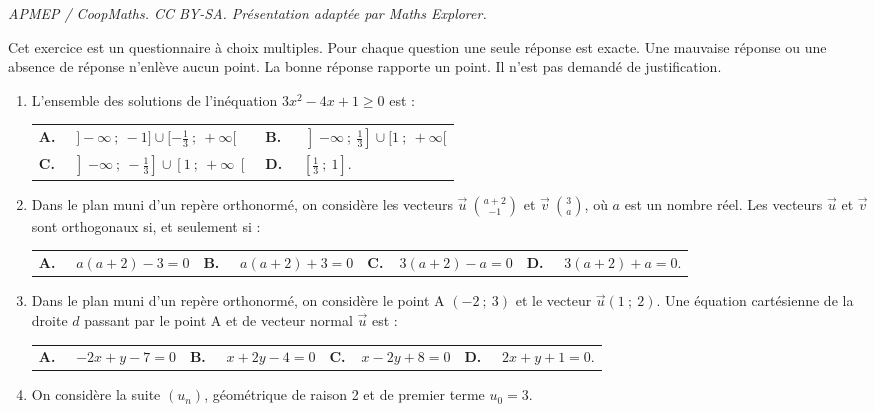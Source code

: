 \documentclass[10pt]{article}
\providecommand{\vv}[1]{\overrightarrow{#1}}
\providecommand{\vv}[1]{{\overrightarrow{#1}}}
\begin{document}
\noindent\textit{APMEP / CoopMaths. CC BY-SA. Présentation adaptée par Maths Explorer.}\par\medskip
\medskip

Cet exercice est un questionnaire à choix multiples. Pour chaque question une seule réponse est exacte. Une mauvaise réponse ou une absence de réponse n'enlève aucun point. La bonne réponse rapporte un point. Il n'est pas demandé de justification.

\begin{enumerate}
\item  L'ensemble des solutions de l'inéquation $3x^2-4x+1\geqslant 0$ est :

\medskip

\begin{tabularx}{\linewidth}{*{2}{X}}
\textbf{A.~~} $]-\infty~;~-1]\cup[-\frac{1}{3}~;~+\infty[ $ &\textbf{B.~~} $ 
\left]-\infty~;~\frac{1}{3}\right]\cup [1~;~+\infty[$\\\textbf{C.~~}$\left]-\infty~;~-\frac{1}{3}\right]\cup\left[1~;~+\infty\right[ $& \textbf{D.~~} $ \left[\frac{1}{3}~;~1\right] $.
\end{tabularx}

\item Dans le plan muni d'un repère orthonormé, on considère les vecteurs $\vv{u} \ \binom{a+2}{-1}$ et $\vv{v}\ \binom{3}{a}$, où $a$ est un nombre réel. Les vecteurs $\vv{u}$ et $\vv{v}$ sont orthogonaux si, et seulement si :

\medskip

\begin{tabularx}{\linewidth}{*{4}{X}}
\textbf{A.~~} $ a(a+2)-3=0$ &\textbf{B.~~} $a(a+2)+3=0 $&\textbf{C.~~}$3(a+2)-a=0 $& \textbf{D.~~} $3(a+2)+a=0  $.
\end{tabularx}

\item Dans le plan muni d'un repère orthonormé, on considère le point A $(-2~;~3)$ et le vecteur $\vv{u} (1~;~2)$. Une équation cartésienne de la droite $d$ passant par le point A et de vecteur normal $\vv{u}$ est :

\medskip

\begin{tabularx}{\linewidth}{*{4}{X}}
\textbf{A.~~} $-2x+y-7=0 $ &\textbf{B.~~} $x+2y-4=0 $&\textbf{C.~~}$x-2y+8=0 $& \textbf{D.~~} $2x+y+1=0  $.
\end{tabularx}

\item On considère la suite $\left(u_n\right)$, géométrique de raison 2 et de premier terme $u_0=3$.


\end{enumerate}
\end{document}
